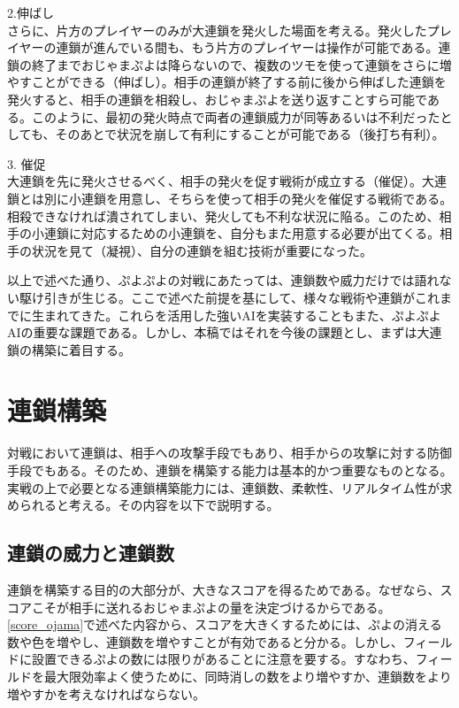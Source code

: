 \documentclass[12pt]{jreport}
\begin{document}
2.伸ばし\\
さらに、片方のプレイヤーのみが大連鎖を発火した場面を考える。発火したプレイヤーの連鎖が進んでいる間も、もう片方のプレイヤーは操作が可能である。連鎖の終了までおじゃまぷよは降らないので、複数のツモを使って連鎖をさらに増やすことができる（伸ばし）。相手の連鎖が終了する前に後から伸ばした連鎖を発火すると、相手の連鎖を相殺し、おじゃまぷよを送り返すことすら可能である。このように、最初の発火時点で両者の連鎖威力が同等あるいは不利だったとしても、そのあとで状況を崩して有利にすることが可能である（後打ち有利）。

3. 催促\\
大連鎖を先に発火させるべく、相手の発火を促す戦術が成立する（催促）。大連鎖とは別に小連鎖を用意し、そちらを使って相手の発火を催促する戦術である。相殺できなければ潰されてしまい、発火しても不利な状況に陥る。このため、相手の小連鎖に対応するための小連鎖を、自分もまた用意する必要が出てくる。相手の状況を見て（凝視）、自分の連鎖を組む技術が重要になった。

以上で述べた通り、ぷよぷよの対戦にあたっては、連鎖数や威力だけでは語れない駆け引きが生じる。ここで述べた前提を基にして、様々な戦術や連鎖がこれまでに生まれてきた。これらを活用した強いAIを実装することもまた、ぷよぷよAIの重要な課題である。しかし、本稿ではそれを今後の課題とし、まずは大連鎖の構築に着目する。


\section{連鎖構築}
対戦において連鎖は、相手への攻撃手段でもあり、相手からの攻撃に対する防御手段でもある。そのため、連鎖を構築する能力は基本的かつ重要なものとなる。実戦の上で必要となる連鎖構築能力には、連鎖数、柔軟性、リアルタイム性が求められると考える。その内容を以下で説明する。

\subsection{連鎖の威力と連鎖数}
連鎖を構築する目的の大部分が、大きなスコアを得るためである。なぜなら、スコアこそが相手に送れるおじゃまぷよの量を決定づけるからである。\ref{score_ojama}で述べた内容から、スコアを大きくするためには、ぷよの消える数や色を増やし、連鎖数を増やすことが有効であると分かる。しかし、フィールドに設置できるぷよの数には限りがあることに注意を要する。すなわち、フィールドを最大限効率よく使うために、同時消しの数をより増やすか、連鎖数をより増やすかを考えなければならない。
\end{document}

